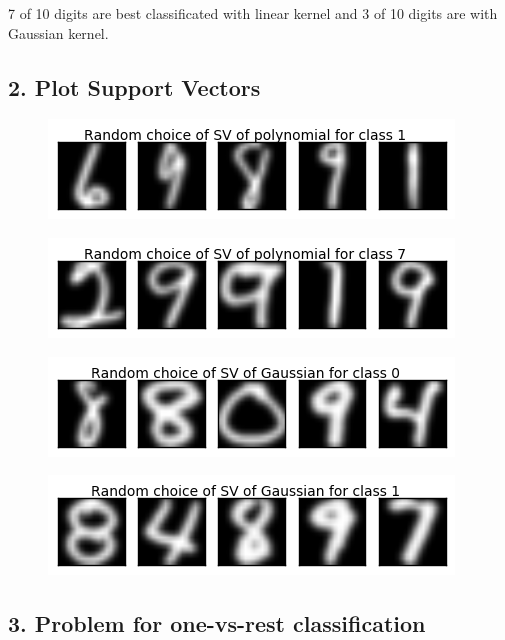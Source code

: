 \documentclass[a4paper,11pt]{article}
\begin{document}
7 of 10 digits are best classificated with linear kernel and 3 of 10 digits are with Gaussian kernel. 


\subsection*{2. Plot Support Vectors}

\begin{figure}[htbp]
  \includegraphics[scale=0.8]{svpc1.png}
\end{figure}

\begin{figure}[htbp]
  \includegraphics[scale=0.8]{svpc7.png}
\end{figure}

\begin{figure}[htbp]
  \includegraphics[scale=0.8]{svgc0.png}
\end{figure}

\begin{figure}[htbp]
  \includegraphics[scale=0.8]{svgc1.png}
\end{figure}


\subsection*{3. Problem for one-vs-rest classification}
\end{document}
